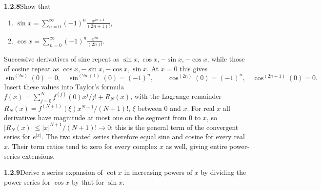 \par\bigskip
\noindent\textbf{1.2.8}\quad Show that
\begin{enumerate}
\item[(a)] $\displaystyle\sin x=\sum_{n=0}^{\infty}(-1)^{n}\frac{x^{2n+1}}{(2n+1)!}$,
\item[(b)] $\displaystyle\cos x=\sum_{n=0}^{\infty}(-1)^{n}\frac{x^{2n}}{(2n)!}$.
\end{enumerate}
\solution
Successive derivatives of sine repeat as
$\sin x,\cos x,-\sin x,-\cos x$, while those of cosine repeat as
$\cos x,-\sin x,-\cos x,\sin x$. At $x=0$ this gives
\[
 \sin^{(2n)}(0)=0,\quad \sin^{(2n+1)}(0)=(-1)^n,
 \qquad
 \cos^{(2n)}(0)=(-1)^n,\quad \cos^{(2n+1)}(0)=0.
\]
Insert these values into Taylor's formula
$f(x)=\sum_{j=0}^N f^{(j)}(0)x^j/j!+R_N(x)$, with the Lagrange
remainder $R_N(x)=f^{(N+1)}(\xi)x^{N+1}/(N+1)!$, $\xi$ between $0$ and $x$.
For real $x$ all derivatives have magnitude at most one on the segment
from $0$ to $x$, so $|R_N(x)|\le |x|^{N+1}/(N+1)!\to0$; this is the
general term of the convergent series for $e^{|x|}$.
The two stated series therefore equal sine and cosine for every real
$x$. Their term ratios tend to zero for every complex $x$ as well,
giving entire power-series extensions.


\par\bigskip
\noindent\textbf{1.2.9}\quad Derive a series expansion of $\cot x$ in
increasing powers of $x$ by dividing the power series for $\cos x$ by that for
$\sin x$.

